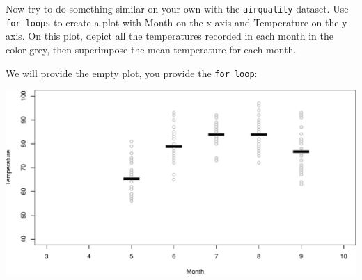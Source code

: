 \documentclass[]{book}
\newenvironment{Shaded}{\begin{snugshade}}{\end{snugshade}}
\newcommand{\CommentTok}[1]{\textcolor[rgb]{0.56,0.35,0.01}{\textit{#1}}}
\newcommand{\ControlFlowTok}[1]{\textcolor[rgb]{0.13,0.29,0.53}{\textbf{#1}}}
\newcommand{\DataTypeTok}[1]{\textcolor[rgb]{0.13,0.29,0.53}{#1}}
\newcommand{\DecValTok}[1]{\textcolor[rgb]{0.00,0.00,0.81}{#1}}
\newcommand{\KeywordTok}[1]{\textcolor[rgb]{0.13,0.29,0.53}{\textbf{#1}}}
\newcommand{\NormalTok}[1]{#1}
\newcommand{\OperatorTok}[1]{\textcolor[rgb]{0.81,0.36,0.00}{\textbf{#1}}}
\newcommand{\StringTok}[1]{\textcolor[rgb]{0.31,0.60,0.02}{#1}}
\begin{document}
Now try to do something similar on your own with the \texttt{airquality} dataset. Use \texttt{for\ loops} to create a plot with Month on the x axis and Temperature on the y axis. On this plot, depict all the temperatures recorded in each month in the color grey, then superimpose the mean temperature for each month.

We will provide the empty plot, you provide the \texttt{for\ loop}:

\begin{Shaded}
\end{Shaded}

\includegraphics{figures/unnamed-chunk-559-1.pdf}
\end{document}
